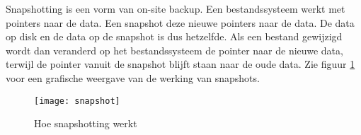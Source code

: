 Snapshotting is een vorm van on-site backup. Een bestandssysteem werkt met pointers naar de data. Een snapshot deze nieuwe pointers naar de data. De data op disk en de data op de snapshot is dus hetzelfde. Als een bestand gewijzigd wordt dan veranderd op het bestandssysteem de pointer naar de nieuwe data, terwijl de pointer vanuit de snapshot blijft staan naar de oude data. Zie figuur \ref{fig:snapshot} voor een grafische weergave van de werking van snapshots.

\begin{figure}[h]
\texttt{[image: snapshot]}
\centering
	\caption{Hoe snapshotting werkt}
	\label{fig:snapshot}
\end{figure}

